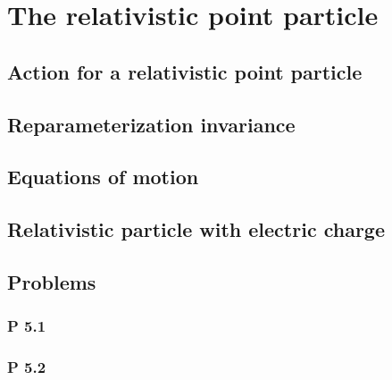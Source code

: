 \documentclass[12pt]{report}
\begin{document}
\tableofcontents
\chapter{The relativistic point particle}
\newpage
\section{Action for a relativistic point particle}


\section{Reparameterization invariance}


\section{Equations of motion}


\section{Relativistic particle with electric charge}


\section{Problems}
\subsection*{P 5.1}

\subsection*{P 5.2}
\end{document}

